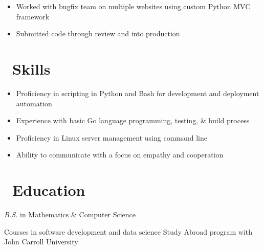 \documentclass{resume}
\begin{document}
\begin{itemize}
  \item Worked with bugfix team on multiple websites using custom Python MVC framework
  \item Submitted code through review and into production
\end{itemize}

\section{\faCogs\ Skills}
\begin{itemize}[parsep=0.5ex]
  \item Proficiency in scripting in Python and Bash for development and deployment automation
  \item Experience with basic Go language programming, testing, \& build process
  \item Proficiency in Linux server management using command line
  \item Ability to communicate with a focus on empathy and cooperation
\end{itemize}

\section{\faGraduationCap\ Education}
\textit{B.S.} in Mathematics \& Computer Science
\par Courses in software development and data science
Study Abroad program with John Carroll University
\end{document}
